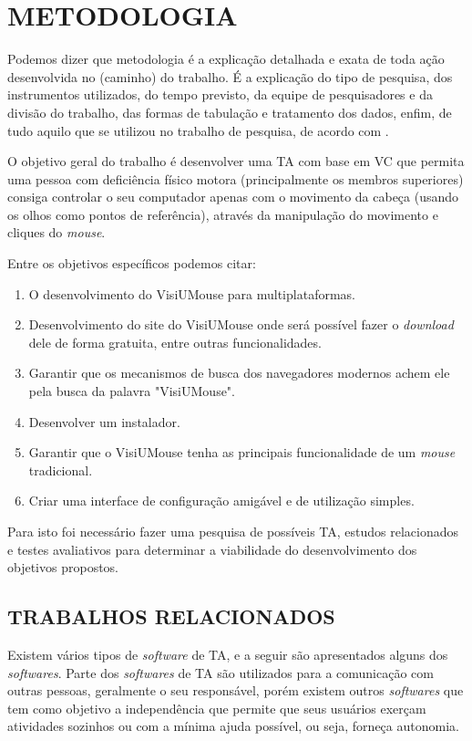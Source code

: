 \chapter{METODOLOGIA}\label{CAP3}

Podemos dizer que metodologia é a explicação detalhada e exata de toda ação desenvolvida no (caminho) do trabalho. É a explicação do tipo de pesquisa, dos instrumentos utilizados, do tempo previsto, da equipe de pesquisadores e da divisão do trabalho, das formas de tabulação e tratamento dos dados, enfim, de tudo aquilo que se utilizou no trabalho de pesquisa, de acordo com .

O objetivo geral do trabalho é desenvolver uma TA com base em VC que permita uma pessoa com deficiência físico motora (principalmente os membros superiores) consiga controlar o seu computador apenas com o movimento da cabeça (usando os olhos como pontos de referência), através da manipulação do movimento e cliques do \textit{mouse}.


Entre os objetivos específicos podemos citar: 
\begin{enumerate}
\item O desenvolvimento do VisiUMouse para multiplataformas.
\item Desenvolvimento do site do VisiUMouse onde será possível fazer o \textit{download} dele de forma gratuita, entre outras funcionalidades.
\item Garantir que os mecanismos de busca dos navegadores modernos achem ele pela busca da palavra "VisiUMouse".
\item Desenvolver um instalador.
\item Garantir que o VisiUMouse tenha as principais funcionalidade de um \textit{mouse} tradicional.
\item Criar uma interface de configuração amigável e de utilização simples.
\end{enumerate}

Para isto foi necessário fazer uma pesquisa de possíveis TA, estudos relacionados e testes avaliativos para determinar a viabilidade do desenvolvimento dos objetivos propostos.
    
\section{TRABALHOS RELACIONADOS}\label{Sub:trabalhos-relacionados}

Existem vários tipos de  \textit{software} de TA, e a seguir são apresentados alguns dos \textit{softwares}. Parte dos \textit{softwares} de TA são utilizados para a comunicação com outras pessoas, geralmente o seu responsável, porém existem outros \textit{softwares} que tem como objetivo a independência que permite que seus usuários exerçam atividades sozinhos ou com a mínima ajuda possível, ou seja, forneça autonomia.

